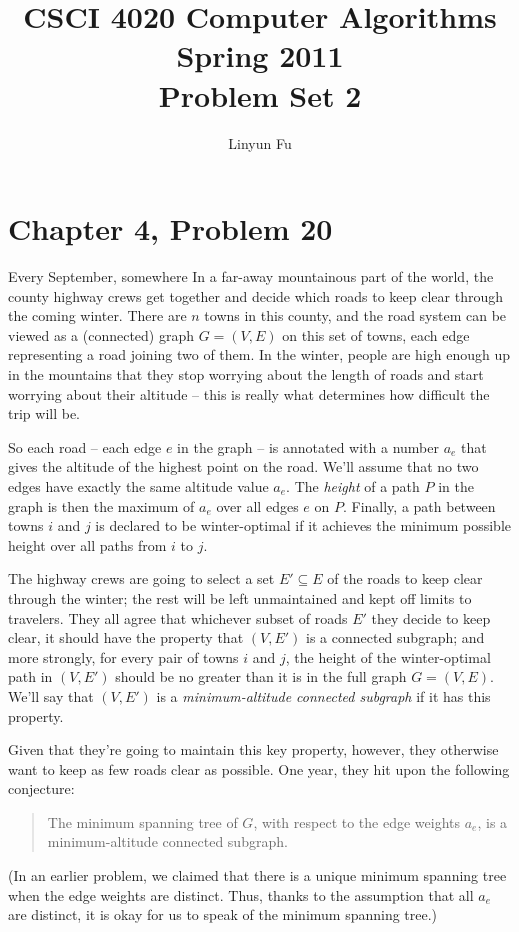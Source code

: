 \documentclass[12pt,letterpaper]{article}
\author{Linyun Fu}
\title{CSCI 4020 Computer Algorithms Spring 2011\\
Problem Set 2}
\begin{document}
\maketitle
\section*{Chapter 4, Problem 20}
Every September, somewhere In a far-away mountainous part of the
world, the county highway crews get together and decide which roads to
keep clear through the coming winter. There are $n$ towns in this county,
and the road system can be viewed as a (connected) graph $G = (V, E)$ on
this set of towns, each edge representing a road joining two of them.
In the winter, people are high enough up in the mountains that they
stop worrying about the length of roads and start worrying about their
altitude -- this is really what determines how difficult the trip will be.

So each road -- each edge $e$ in the graph -- is annotated with a number
$a_e$ that gives the altitude of the highest point on the road. We'll assume
that no two edges have exactly the same altitude value $a_e$. The \emph{height} of
a path $P$ in the graph is then the maximum of $a_e$ over all edges $e$ on $P$.
Finally, a path between towns $i$ and $j$ is declared to be winter-optimal if it
achieves the minimum possible height over all paths from $i$ to $j$.

The highway crews are going to select a set $E' \subseteq E$ of the roads to keep
clear through the winter; the rest will be left unmaintained and kept off
limits to travelers. They all agree that whichever subset of roads $E'$ they
decide to keep clear, it should have the property that $(V, E')$ is a connected
subgraph; and more strongly, for every pair of towns $i$ and $j$, the height
of the winter-optimal path in $(V, E')$ should be no greater than it is in the
full graph $G = (V, E)$. We'll say that $(V, E')$ is a \emph{minimum-altitude connected
subgraph} if it has this property.

Given that they're going to maintain this key property, however, they
otherwise want to keep as few roads clear as possible. One year, they hit
upon the following conjecture:
\begin{quote}
The minimum spanning tree of $G$, with respect to the edge weights $a_e$, is a
minimum-altitude connected subgraph.
\end{quote}
(In an earlier problem, we claimed that there is a unique minimum spanning
tree when the edge weights are distinct. Thus, thanks to the assumption
that all $a_e$ are distinct, it is okay for us to speak of the minimum
spanning tree.)
\end{document}
